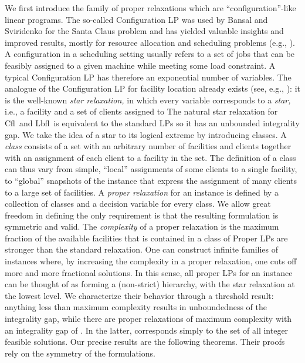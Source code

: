 \documentclass[11pt]{article}\usepackage{amsmath}
\newcommand{\lbfl}{{\sc Lbfl}}
\newcommand{\cfl}{{\sc Cfl}}
\begin{document}
We first introduce    
the family of  proper relaxations
which are ``configuration''-like linear programs.
The so-called Configuration LP was  used by 
Bansal and Sviridenko 
\cite{BansalS06} for the Santa Claus problem and has yielded valuable insights
and improved results, mostly
for resource allocation  and scheduling problems
(e.g., \cite{Svensson11, AsadpourFS11,
HaeuplerSS11, SviridenkoW13}).
A configuration in a scheduling setting usually refers to a set of
jobs  that
can be feasibly assigned to a given  machine  while meeting some load
constraint. A typical Configuration LP has therefore    an exponential number of
variables.    
The analogue of the Configuration
LP for facility location already exists (see, e.g., \cite{JainMMSV03}): it is the well-known 
{\em star relaxation,} in which every  variable corresponds to a {\em star,} i.e., a
facility  and a set
of clients assigned to  
The natural star relaxation 
for   \cfl\ and \lbfl\  is  equivalent to the standard LPs 
so it has an unbounded integrality gap.  
We take the idea of a star  to its logical  extreme by 
introducing  classes. 
A {\em class} consists of a set with an arbitrary number of facilities and clients
together with an 
assignment of each client to a facility in the set. 
The definition
of a class can thus vary from simple, ``local'' 
assignments of  some clients to  a  single facility, to  
 ``global'' snapshots  of the instance that 
express  the assignment  of many
clients to a large set of  facilities.  
A {\em proper relaxation} for an instance is defined by a collection
 of classes and a decision variable for every class. 
We allow great freedom in 
defining   
the only requirement   is that the resulting
formulation is symmetric and valid. 
The {\em complexity } of a proper relaxation is the maximum fraction
 of the 
available facilities that is contained in a class of 
Proper LPs are stronger than the standard relaxation. 
One can
construct infinite 
families  of instances 
where, by  increasing the complexity in a proper relaxation, one cuts off  more
and more fractional solutions.  
In this sense, all proper LPs for an instance can
be  thought of as forming  a (non-strict)    hierarchy, with the star
relaxation at the lowest level. 
We characterize their behavior  through a threshold result: 
anything less than maximum complexity results in unboundedness of
the integrality gap, while there are
proper relaxations of maximum complexity with an integrality gap of
.  In the latter,  corresponds simply to 
the set of all integer feasible solutions. 
Our precise results 
are the following theorems. Their proofs rely 
on the symmetry of the formulations. 
\end{document}
